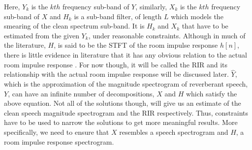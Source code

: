 \documentclass[12pt, a4paper, oneside]{book}
\begin{document}
Here, $Y_k$ is the $kth$ frequency sub-band of $Y$, similarly, $X_k$ is the $kth$ frequency sub-band of $X$ and $H_k$ is a sub-band filter, of length $L$ which models the smearing of the clean spectrum sub-band. It is $H_k$ and $X_k$ that have to be estimated from the given $Y_k$, under reasonable constraints. Although in much of the literature, $H$, is said to be the STFT of the room impulse response $h[n]$, there is little evidence in literature that it has any obvious relation to the actual room impulse response . For now though, it will be called the RIR and its relationship with the actual room impulse response will be discussed later. $\hat{Y}$, which is the approximation of the magnitude spectrogram of reverberant speech, $Y$, can have an infinite number of decompositions, $X$ and $H$ which satisfy the above equation. Not all of the solutions though, will give us an estimate of the clean speech magnitude spectrogram and the RIR respectively. Thus, constraints have to be used to narrow the solutions to get more meaningful results. More specifically, we need to ensure that $X$ resembles a speech spectrogram and $H$, a room impulse response spectrogram. 
\end{document}
